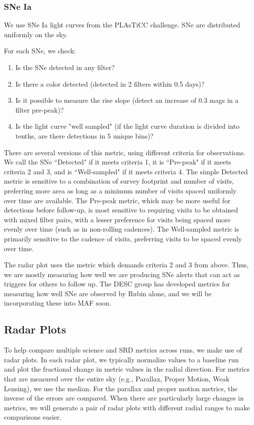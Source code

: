 \subsubsection{SNe Ia}

We use SNe Ia light curves from the PLAsTiCC challenge. SNe are distributed uniformly on the sky. 

For each SNe, we check:
\begin{enumerate}
    \item{Is the SNe detected in any filter?}
    \item{Is there a color detected (detected in 2 filters within 0.5 days)?}
    \item{Is it possible to measure the rise slope (detect an increase of 0.3 mags in a filter pre-peak)?}
    \item{Is the light curve "well sampled" (if the light curve duration is divided into tenths, are there detections in 5 unique bins)?}
\end{enumerate}

There are several versions of this metric, using different criteria for observations. We call the SNe ``Detected" if it meets criteria 1, it is ``Pre-peak" if it meets criteria 2 and 3, and is ``Well-sampled" if it meets criteria 4.
The simple Detected metric is sensitive to a combination of survey footprint and number of visits, preferring more area as long as a minimum number of visits spaced uniformly over time are available. The Pre-peak metric, which may be more useful for detections before follow-up, is most sensitive to requiring visits to be obtained with mixed filter pairs, with a lesser preference for visits being spaced more evenly over time (such as in non-rolling cadences). The Well-sampled metric is primarily sensitive to the cadence of visits, preferring visits to be spaced evenly over time. 

The radar plot uses the metric which demands criteria 2 and 3 from above. Thus, we are mostly measuring how well we are producing SNe alerts that can act as triggers for others to follow up. The DESC group has developed metrics for measuring how well SNe are observed by Rubin alone, and we will be incorporating these into MAF soon.


\subsection{Radar Plots}

To help compare multiple science and SRD metrics across runs, we make use of radar plots. In each radar plot, we typically normalize values to a baseline run and plot the fractional change in metric values in the radial direction. For metrics that are measured over the entire sky (e.g., Parallax, Proper Motion, Weak Lensing), we use the median. For the parallax and proper motion metrics, the inverse of the errors are compared. When there are particularly large changes in metrics, we will generate a pair of radar plots with different radial ranges to make comparisons easier.

